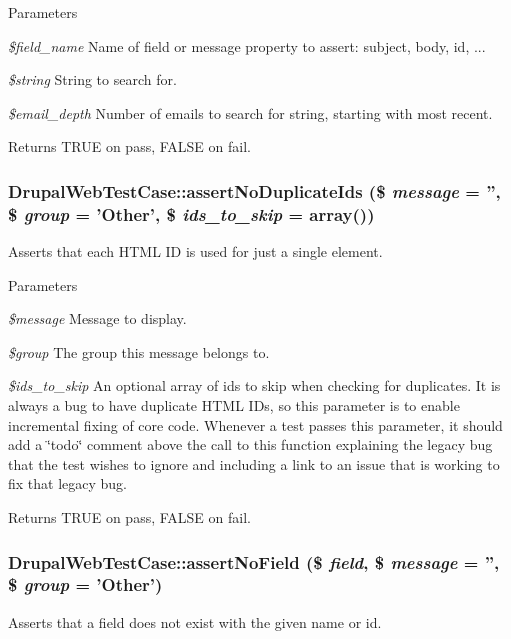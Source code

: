 \begin{DoxyParams}{Parameters}
\item[{\em \$field\_\-name}]Name of field or message property to assert: subject, body, id, ... \item[{\em \$string}]String to search for. \item[{\em \$email\_\-depth}]Number of emails to search for string, starting with most recent.\end{DoxyParams}
\begin{DoxyReturn}{Returns}
TRUE on pass, FALSE on fail. 
\end{DoxyReturn}
\hypertarget{classDrupalWebTestCase_ab42872d80b96a79026d064c5bcf67138}{
\subsubsection[{assertNoDuplicateIds}]{\setlength{\rightskip}{0pt plus 5cm}DrupalWebTestCase::assertNoDuplicateIds (\$ {\em message} = {\ttfamily ''}, \/  \$ {\em group} = {\ttfamily 'Other'}, \/  \$ {\em ids\_\-to\_\-skip} = {\ttfamily array()})}}
\label{classDrupalWebTestCase_ab42872d80b96a79026d064c5bcf67138}
Asserts that each HTML ID is used for just a single element.


\begin{DoxyParams}{Parameters}
\item[{\em \$message}]Message to display. \item[{\em \$group}]The group this message belongs to. \item[{\em \$ids\_\-to\_\-skip}]An optional array of ids to skip when checking for duplicates. It is always a bug to have duplicate HTML IDs, so this parameter is to enable incremental fixing of core code. Whenever a test passes this parameter, it should add a \char`\"{}todo\char`\"{} comment above the call to this function explaining the legacy bug that the test wishes to ignore and including a link to an issue that is working to fix that legacy bug. \end{DoxyParams}
\begin{DoxyReturn}{Returns}
TRUE on pass, FALSE on fail. 
\end{DoxyReturn}
\hypertarget{classDrupalWebTestCase_a450b5b0be6615e14e94415e087c31706}{
\subsubsection[{assertNoField}]{\setlength{\rightskip}{0pt plus 5cm}DrupalWebTestCase::assertNoField (\$ {\em field}, \/  \$ {\em message} = {\ttfamily ''}, \/  \$ {\em group} = {\ttfamily 'Other'})}}
\label{classDrupalWebTestCase_a450b5b0be6615e14e94415e087c31706}
Asserts that a field does not exist with the given name or id.


